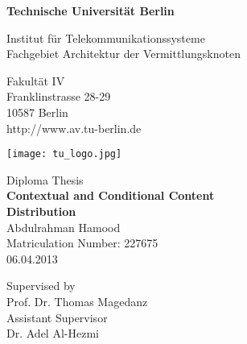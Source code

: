 \thispagestyle{empty}
\begin{center}

\vspace*{0.5cm}
{\LARGE \textbf{Technische Universität Berlin}}

\vspace{0.5cm}

{\large Institut für Telekommunikationssysteme\\[1mm]}
{\large Fachgebiet Architektur der Vermittlungsknoten\\[5mm]}

Fakultät IV\\
Franklinstrasse 28-29\\
10587 Berlin\\
http://www.av.tu-berlin.de\\
\vspace*{1cm}

\texttt{[image: tu\_logo.jpg]}

\vspace*{1.0cm}

{\LARGE Diploma Thesis}\\

\vspace{1.0cm}
{\LARGE \textbf{Contextual and Conditional Content}}\\
\vspace*{0.5cm}
{\LARGE \textbf{Distribution}}\\
\vspace*{1.0cm}
{\LARGE Abdulrahman Hamood}
\\
\vspace*{0.5cm}
Matriculation Number: 227675\\
06.04.2013\\ %
\vspace*{0.5cm}

Supervised by\\
Prof. Dr. Thomas Magedanz\\
\vspace*{0.3cm}
Assistant Supervisor\\
Dr. Adel Al-Hezmi
\vspace{0.5cm}


\end{center}

